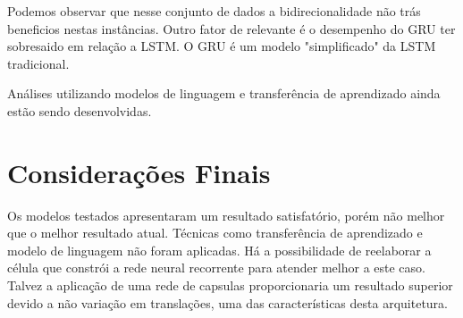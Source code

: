 \documentclass[12pt]{article}
\begin{document}
Podemos observar que nesse conjunto de dados a bidirecionalidade não trás beneficios nestas instâncias. Outro fator de relevante é o desempenho do GRU ter sobresaido em relação a LSTM. O GRU é um modelo "simplificado" da LSTM tradicional.

Análises utilizando modelos de linguagem e transferência de aprendizado ainda estão sendo desenvolvidas.

\section{Considerações Finais}

Os modelos testados apresentaram um resultado satisfatório, porém não melhor que o melhor resultado atual. Técnicas como transferência de aprendizado e modelo de linguagem não foram aplicadas. Há a possibilidade de reelaborar a célula que constrói a rede neural recorrente para atender melhor a este caso. Talvez a aplicação de uma rede de capsulas \cite{DBLP:journals/corr/abs-1710-09829} proporcionaria um resultado superior devido a não variação em translações, uma das características desta arquitetura. 



\end{document}
